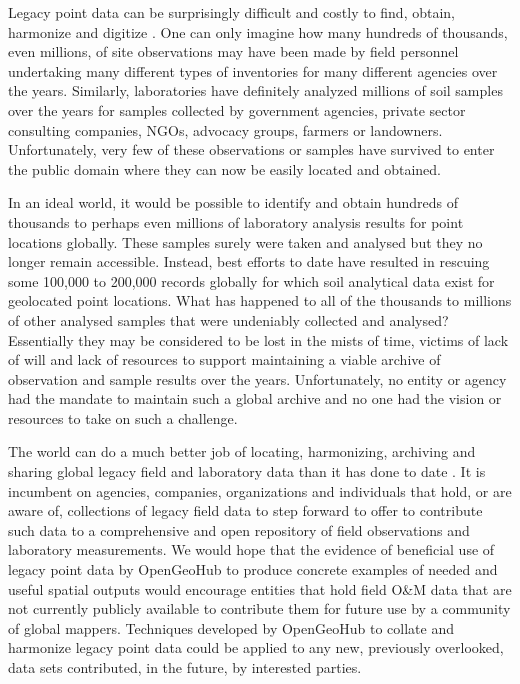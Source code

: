 \documentclass[graybox,natbib,nospthms,UStrade]{svmono}
\begin{document}
Legacy point data can be surprisingly difficult and costly to find,
obtain, harmonize and digitize \citep{arrouays2017soil}. One can only imagine how many hundreds
of thousands, even millions, of site observations may have been made by
field personnel undertaking many different types of inventories for many
different agencies over the years. Similarly, laboratories have
definitely analyzed millions of soil samples over the years for samples
collected by government agencies, private sector consulting companies,
NGOs, advocacy groups, farmers or landowners. Unfortunately, very few of
these observations or samples have survived to enter the public domain
where they can now be easily located and obtained.

In an ideal world, it would be possible to identify and obtain hundreds
of thousands to perhaps even millions of laboratory analysis results for
point locations globally. These samples surely were taken and analysed
but they no longer remain accessible. Instead, best efforts to date have
resulted in rescuing some 100,000 to 200,000 records globally for which
soil analytical data exist for geolocated point locations. What has
happened to all of the thousands to millions of other analysed samples
that were undeniably collected and analysed? Essentially they may be
considered to be lost in the mists of time, victims of lack of will and
lack of resources to support maintaining a viable archive of observation
and sample results over the years. Unfortunately, no entity or agency
had the mandate to maintain such a global archive and no one had the
vision or resources to take on such a challenge.

The world can do a much better job of locating, harmonizing, archiving
and sharing global legacy field and laboratory data than it has done to
date \citep{arrouays2017soil}. It is incumbent on agencies, companies, organizations and
individuals that hold, or are aware of, collections of legacy field data
to step forward to offer to contribute such data to a comprehensive and
open repository of field observations and laboratory measurements. We
would hope that the evidence of beneficial use of legacy point data by
OpenGeoHub to produce concrete examples of needed and useful spatial
outputs would encourage entities that hold field O\&M data that are not
currently publicly available to contribute them for future use by a
community of global mappers. Techniques developed by OpenGeoHub to
collate and harmonize legacy point data could be applied to any new,
previously overlooked, data sets contributed, in the future, by
interested parties.
\end{document}
